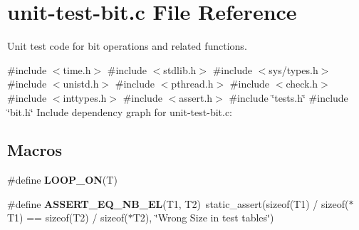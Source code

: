 \hypertarget{unit-test-bit_8c}{}\section{unit-\/test-\/bit.c File Reference}
\label{unit-test-bit_8c}


Unit test code for bit operations and related functions.  


{\ttfamily \#include $<$time.\+h$>$}\newline
{\ttfamily \#include $<$stdlib.\+h$>$}\newline
{\ttfamily \#include $<$sys/types.\+h$>$}\newline
{\ttfamily \#include $<$unistd.\+h$>$}\newline
{\ttfamily \#include $<$pthread.\+h$>$}\newline
{\ttfamily \#include $<$check.\+h$>$}\newline
{\ttfamily \#include $<$inttypes.\+h$>$}\newline
{\ttfamily \#include $<$assert.\+h$>$}\newline
{\ttfamily \#include \char`\"{}tests.\+h\char`\"{}}\newline
{\ttfamily \#include \char`\"{}bit.\+h\char`\"{}}\newline
Include dependency graph for unit-\/test-\/bit.c\+:
\subsection*{Macros}
\begin{DoxyCompactItemize}
\item 
\#define {\bfseries L\+O\+O\+P\+\_\+\+ON}(T)
\item 
\mbox{\label{unit-test-bit_8c_a412e475035f76eb4fed2cfd999c8d89c}} 
\#define {\bfseries A\+S\+S\+E\+R\+T\+\_\+\+E\+Q\+\_\+\+N\+B\+\_\+\+EL}(T1,  T2)~static\+\_\+assert(sizeof(T1) / sizeof($\ast$T1) == sizeof(T2) / sizeof($\ast$T2), \char`\"{}Wrong Size in test tables\char`\"{})
\end{DoxyCompactItemize}
